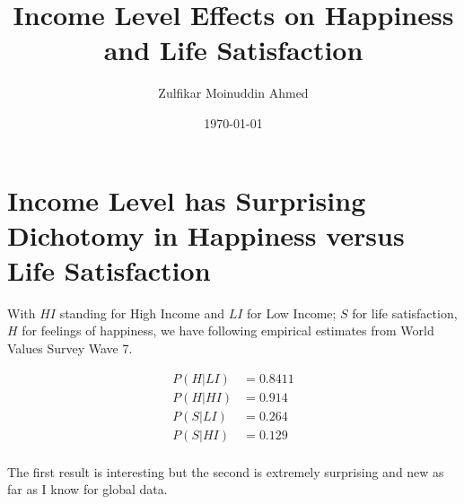 \documentclass{amsart}
\title{Income Level Effects on Happiness and Life Satisfaction}
\author{Zulfikar Moinuddin Ahmed}
\date{\today}
\begin{document}
\maketitle

\section{Income Level has Surprising Dichotomy in Happiness versus Life Satisfaction}

With $HI$ standing for High Income and $LI$ for Low Income; $S$ for life satisfaction, $H$ for feelings of happiness, we have following empirical estimates from World Values Survey Wave 7.

\begin{eqnarray*}
P(H|LI) &= 0.8411\\
P(H|HI) &= 0.914\\
P(S|LI) &= 0.264\\
P(S|HI) &= 0.129\\
\end{eqnarray*}

The first result is interesting but the second is extremely surprising and new as far as I know for global data.
\end{document}
